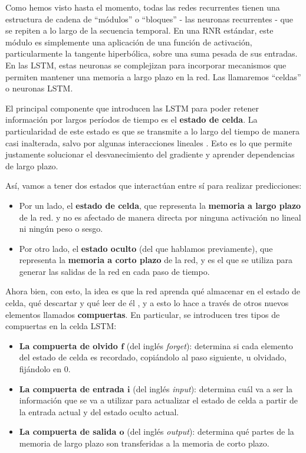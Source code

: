 \documentclass[../../main.tex]{subfiles}
\begin{document}
Como hemos visto hasta el momento, todas las redes recurrentes tienen una estructura de
cadena de ``módulos'' o ``bloques'' \cite{colahs-blog-lstm-2015} - las neuronas
recurrentes - que se repiten a lo largo de la secuencia temporal. En una RNR estándar,
este módulo es simplemente una aplicación de una función de activación, particularmente la
tangente hiperbólica, sobre una suma pesada de sus entradas. En las LSTM, estas neuronas
se complejizan para incorporar mecanismos que permiten mantener una memoria a largo plazo
en la red. Las llamaremos ``celdas'' o neuronas LSTM.

El principal componente que introducen las LSTM para poder retener información por largos
períodos de tiempo es el \textbf{estado de celda}. La particularidad de este estado es que
se transmite a lo largo del tiempo de manera casi inalterada, salvo por algunas
interacciones lineales \cite{colahs-blog-lstm-2015} \cite{ai-a-modern-approach}. Esto es
lo que permite justamente solucionar el desvanecimiento del gradiente y aprender
dependencias de largo plazo.

Así, vamos a tener dos estados que interactúan entre sí para realizar predicciones:
\begin{itemize}
    \item Por un lado, el \textbf{estado de celda}, que representa la \textbf{memoria a
    largo plazo} de la red. y no es afectado de manera directa por ninguna activación no
    lineal ni ningún peso o sesgo.
    \item Por otro lado, el \textbf{estado oculto} (del que hablamos previamente), que
    representa la \textbf{memoria a corto plazo} de la red, y es el que se utiliza para
    generar las salidas de la red en cada paso de tiempo.
\end{itemize}

Ahora bien, con esto, la idea es que la red aprenda qué almacenar en el estado de celda,
qué descartar y qué leer de él \cite{hands-on-ML-sklearn-tf}, y a esto lo hace a través de
otros nuevos elementos llamados \textbf{compuertas}. En particular, se introducen tres
tipos de compuertas en la celda LSTM:
\begin{itemize}
    \item \textbf{La compuerta de olvido \(\bm{f}\)} (del inglés \textit{forget}):
    determina si cada elemento del estado de celda es recordado, copiándolo al paso
    siguiente, u olvidado, fijándolo en 0.
    \item \textbf{La compuerta de entrada \(\bm{i}\)} (del inglés \textit{input}):
    determina cuál va a ser la información que se va a utilizar para actualizar
    el estado de celda a partir de la entrada actual y del estado oculto actual.
    \item \textbf{La compuerta de salida \(\bm{o}\)} (del inglés \textit{output}):
    determina qué partes de la memoria de largo plazo son transferidas a la memoria
    de corto plazo.
\end{itemize}
\end{document}
